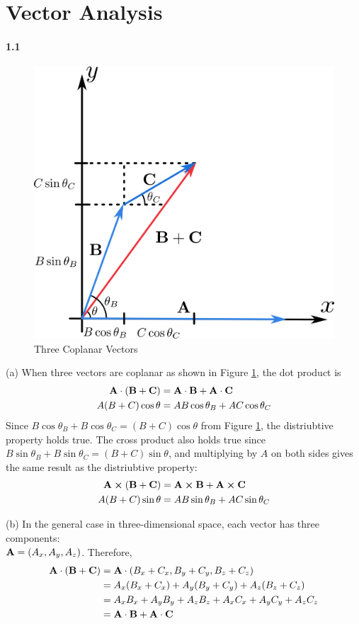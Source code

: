 \documentclass[../main.tex]{subfiles}
\begin{document}
\section{Vector Analysis}
\barh 

\paragraph{1.1}
\begin{figure}[ht]
    \centering
    \includegraphics[width=0.5\linewidth]{images/fig1_1.png}
    \caption{Three Coplanar Vectors}
    \label{fig:1.1}
\end{figure}
(a) When three vectors are coplanar as shown in Figure \ref{fig:1.1}, the dot product is
\begin{align*}
    \vb{A} \cdot (\vb{B} + \vb{C}) &= \vb{A} \cdot \vb{B} + \vb{A} \cdot \vb{C} \\
    A (B+C) \cos \theta &= A B \cos \theta_B + A C \cos \theta_C
\end{align*}
Since $B \cos{\theta_B} + B \cos{\theta_C} = (B+C)\cos{\theta}$ from Figure \ref{fig:1.1}, the
distriubtive property holds true. The cross product also holds true since
$B \sin{\theta_B} + B \sin{\theta_C} = (B+C)\sin{\theta}$, and multiplying by $A$ on both sides
gives the same result as the distriubtive property:
\begin{align*}
    \vb{A} \cp (\vb{B} + \vb{C}) &= \vb{A} \cp\vb{B} + \vb{A} \cp\vb{C} \\
    A (B+C) \sin \theta &= A B \sin \theta_B + A C \sin \theta_C
\end{align*}

(b) In the general case in three-dimensional space, each vector has three components: \\
$\vb{A} = (A_x, A_y, A_z)$. Therefore,
\begin{align*}
    \vb{A} \cdot (\vb{B} + \vb{C}) &=
        \vb{A} \cdot (B_x + C_x, B_y + C_y, B_z + C_z) \\
    &= A_x (B_x + C_x) + A_y (B_y + C_y) + A_z (B_z + C_z) \\
    &= A_x B_x + A_y B_y + A_z B_z + A_x C_x + A_y C_y + A_z C_z \\
    &= \vb{A} \cdot \vb{B} + \vb{A} \cdot \vb{C}
\end{align*}
\end{document}
